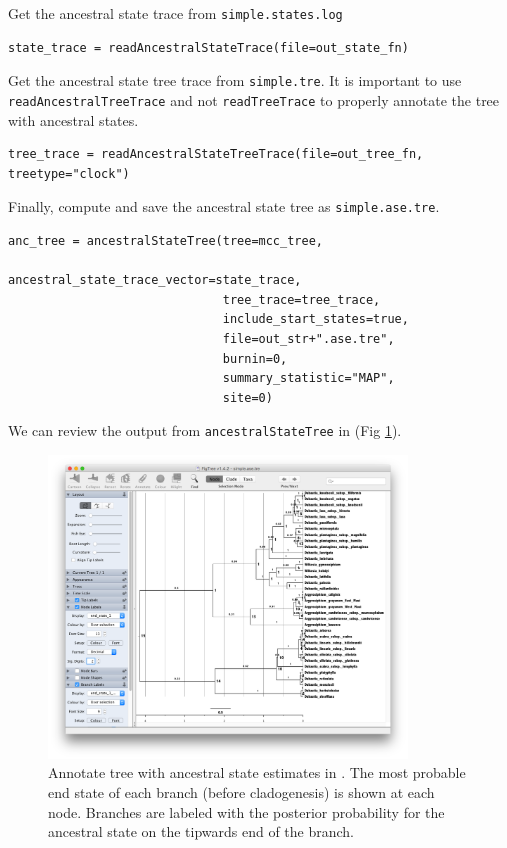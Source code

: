 Get the ancestral state trace from {\tt simple.states.log}

\begin{snugshade}
\begin{lstlisting}
state_trace = readAncestralStateTrace(file=out_state_fn)
\end{lstlisting}
\end{snugshade}


Get the ancestral state tree trace from {\tt simple.tre}.
It is important to use {\tt readAncestralTreeTrace} and not {\tt readTreeTrace} to properly annotate the tree with ancestral states.

\begin{snugshade}
\begin{lstlisting}
tree_trace = readAncestralStateTreeTrace(file=out_tree_fn, treetype="clock")
\end{lstlisting}
\end{snugshade}

Finally, compute and save the ancestral state tree as {\tt simple.ase.tre}.

\begin{snugshade}
\begin{lstlisting}
anc_tree = ancestralStateTree(tree=mcc_tree,
                              ancestral_state_trace_vector=state_trace,
                              tree_trace=tree_trace,
                              include_start_states=true,
                              file=out_str+".ase.tre",
                              burnin=0,
                              summary_statistic="MAP",
                              site=0)
\end{lstlisting}
\end{snugshade}

We can review the output from {\tt ancestralStateTree} in \FigTree (Fig \ref{fig:simple_FigTree_ase}).

\begin{figure}[!ht]
\centering
\includegraphics[width=0.85\textwidth]{figures/fig_simple_FigTree_ase.png}
\caption{Annotate tree with ancestral state estimates in \FigTree.
The most probable end state of each branch (before cladogenesis) is shown at each node.
Branches are labeled with the posterior probability for the ancestral state on the tipwards end of the branch.
}
\label{fig:simple_FigTree_ase}
\end{figure}

